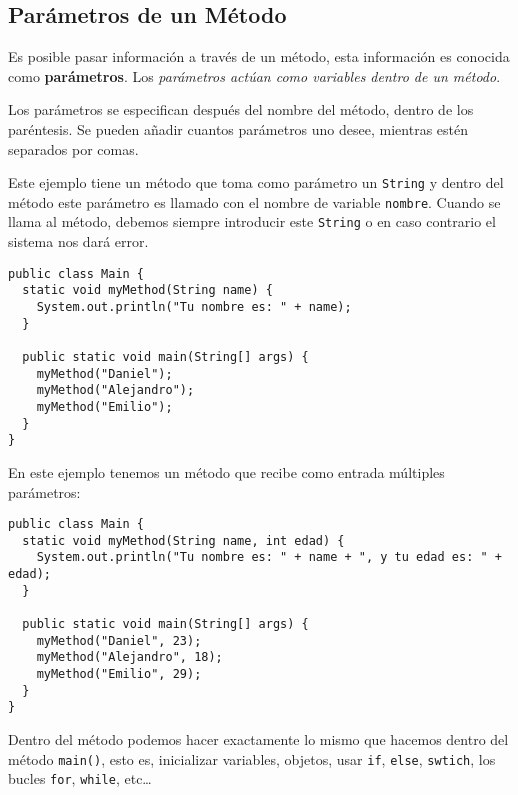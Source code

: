 \documentclass[12pt]{article}
\newcounter{it}
\theoremstyle{largebreak}
\begin{document}
    \subsection{Parámetros de un Método}

    Es posible pasar información a través de un método, esta información es conocida como \textbf{parámetros}. Los \textit{parámetros actúan como variables dentro de un método}.

    Los parámetros se especifican después del nombre del método, dentro de los paréntesis. Se pueden añadir cuantos parámetros uno desee, mientras estén separados por comas.

    \begin{exa}
        Este ejemplo tiene un método que toma como parámetro un \lstinline|String| y dentro del método este parámetro es llamado con el nombre de variable \lstinline|nombre|. Cuando se llama al método, debemos siempre introducir este \lstinline|String| o en caso contrario el sistema nos dará error.
        \begin{lstlisting}[caption={Parámetro en un Método.},label=DescriptiveLabel]
public class Main {
  static void myMethod(String name) {
    System.out.println("Tu nombre es: " + name);
  }

  public static void main(String[] args) {
    myMethod("Daniel");
    myMethod("Alejandro");
    myMethod("Emilio");
  }
}
        \end{lstlisting}
    \end{exa}

    \begin{exa}
        En este ejemplo tenemos un método que recibe como entrada múltiples parámetros:
        \begin{lstlisting}[caption={Método con Múltiples Parámetros.},label=DescriptiveLabel]
public class Main {
  static void myMethod(String name, int edad) {
    System.out.println("Tu nombre es: " + name + ", y tu edad es: " + edad);
  }

  public static void main(String[] args) {
    myMethod("Daniel", 23);
    myMethod("Alejandro", 18);
    myMethod("Emilio", 29);
  }
}
        \end{lstlisting}
    \end{exa}

    \begin{obs}
        Dentro del método podemos hacer exactamente lo mismo que hacemos dentro del método \lstinline|main()|, esto es, inicializar variables, objetos, usar \lstinline|if|, \lstinline|else|, \lstinline|swtich|, los bucles \lstinline|for|, \lstinline|while|, etc\dots
    \end{obs}
\end{document}

